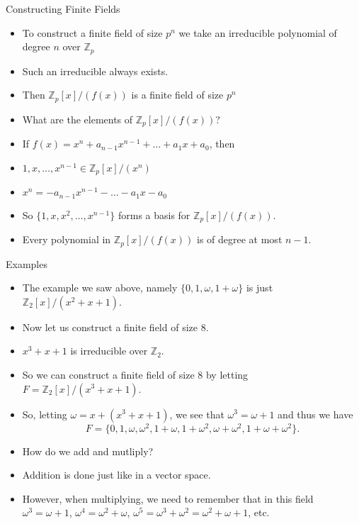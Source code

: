 \documentclass[ %
 10pt, xcolor={dvipsnames,svgnames,x11names,hyperref},
   hyperref={colorlinks=true,citecolor=green,linkcolor=DarkRed,urlcolor=ProcessBlue,anchorcolor=blue}
  ]{beamer}
\newenvironment{stepitemize}{\begin{itemize}[<+->]}{\end{itemize} }
\newcommand{\Z}{\mathbb{Z}}
\begin{document}
\begin{frame}{Constructing Finite Fields}
\begin{stepitemize}
    \item To construct a finite field of size $p^n$ we take an irreducible polynomial of degree $n$ over $\Z_p$
    \item Such an irreducible always exists.
    \item Then $\Z_p[x]/(f(x))$ is a finite field of size $p^n$
    \item What are the elements of $\Z_p[x]/(f(x))$?
    \item If $f(x)= x^n+a_{n-1}x^{n-1}+\dots+a_1x+a_0$, then 
    \item $1, x, \dots, x^{n-1} \in \Z_p[x]/(x^n)$
    \item $x^n=-a_{n-1}x^{n-1}-\dots-a_1x-a_0$
    \item So $\{1, x, x^2, \dots, x^{n-1}\}$ forms a basis for $\Z_p[x]/(f(x))$.
    \item Every polynomial in $\Z_p[x]/(f(x))$ is of degree at most $n-1$. 
\end{stepitemize}
\end{frame}

\begin{frame}{Examples}
\begin{stepitemize}
\item The example we saw above, namely $\{0,1,\omega, 1+\omega\}$ is just $\Z_2[x]/(x^2+x+1)$.
    \item Now let us construct a finite field of size $8$.
    \item $x^3+x+1$ is irreducible over $\Z_2$. 
    \item So we can construct a finite field of size $8$ by letting $F= \Z_2[x]/(x^3+x+1)$. 
    
    \item So, letting $\omega = x+(x^3+x+1)$, we see that $\omega^3=\omega+1$ and thus we have 
    $$F = \{0,1, \omega, \omega ^2, 1+\omega, 1+\omega^2, \omega+\omega^2, 1+\omega+\omega^2\}.$$ 
    \item How do we add and mutliply? 
    \item Addition is done just like in a vector space. \item However, when multiplying, we need to remember that in this field $\omega^3=\omega+1$, $\omega^4=\omega^2+\omega$, $\omega^5 = \omega^3+\omega^2= \omega^2+\omega+1$, etc.  
\end{stepitemize}
\end{frame}
\end{document}
